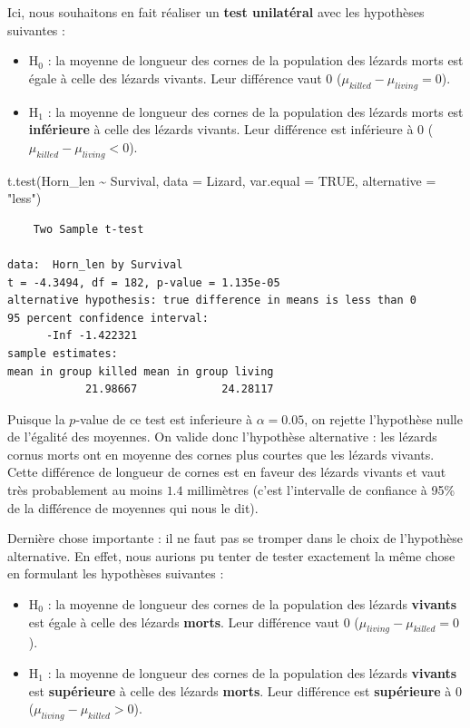 \documentclass[
  a4paper,
]{article}
\newenvironment{Shaded}{\begin{snugshade}}{\end{snugshade}}
\newcommand{\AttributeTok}[1]{\textcolor[rgb]{0.00,0.34,0.68}{#1}}
\newcommand{\ConstantTok}[1]{\textcolor[rgb]{0.67,0.33,0.00}{#1}}
\newcommand{\FunctionTok}[1]{\textcolor[rgb]{0.39,0.29,0.61}{#1}}
\newcommand{\NormalTok}[1]{\textcolor[rgb]{0.12,0.11,0.11}{#1}}
\newcommand{\SpecialCharTok}[1]{\textcolor[rgb]{0.24,0.68,0.91}{#1}}
\newcommand{\StringTok}[1]{\textcolor[rgb]{0.75,0.01,0.01}{#1}}
\providecommand{\tightlist}{%
  \setlength{\itemsep}{0pt}\setlength{\parskip}{0pt}}
\begin{document}
Ici, nous souhaitons en fait réaliser un \textbf{test unilatéral} avec les hypothèses suivantes :

\begin{itemize}
\tightlist
\item
  H\(_0\) : la moyenne de longueur des cornes de la population des lézards morts est égale à celle des lézards vivants. Leur différence vaut 0 (\(\mu_{killed}-\mu_{living} = 0\)).
\item
  H\(_1\) : la moyenne de longueur des cornes de la population des lézards morts est \textbf{inférieure} à celle des lézards vivants. Leur différence est inférieure à 0 (\(\mu_{killed}-\mu_{living} < 0\)).
\end{itemize}

\begin{Shaded}
\begin{Highlighting}[]
\FunctionTok{t.test}\NormalTok{(Horn\_len }\SpecialCharTok{\textasciitilde{}}\NormalTok{ Survival, }
       \AttributeTok{data =}\NormalTok{ Lizard, }\AttributeTok{var.equal =} \ConstantTok{TRUE}\NormalTok{,}
       \AttributeTok{alternative =} \StringTok{"less"}\NormalTok{)}
\end{Highlighting}
\end{Shaded}

\begin{verbatim}
    Two Sample t-test

data:  Horn_len by Survival
t = -4.3494, df = 182, p-value = 1.135e-05
alternative hypothesis: true difference in means is less than 0
95 percent confidence interval:
      -Inf -1.422321
sample estimates:
mean in group killed mean in group living 
            21.98667             24.28117 
\end{verbatim}

Puisque la \(p\)-value de ce test est inferieure à \(\alpha = 0.05\), on rejette l'hypothèse nulle de l'égalité des moyennes. On valide donc l'hypothèse alternative : les lézards cornus morts ont en moyenne des cornes plus courtes que les lézards vivants. Cette différence de longueur de cornes est en faveur des lézards vivants et vaut très probablement au moins \(1.4\) millimètres (c'est l'intervalle de confiance à 95\% de la différence de moyennes qui nous le dit).

Dernière chose importante : il ne faut pas se tromper dans le choix de l'hypothèse alternative. En effet, nous aurions pu tenter de tester exactement la même chose en formulant les hypothèses suivantes :

\begin{itemize}
\tightlist
\item
  H\(_0\) : la moyenne de longueur des cornes de la population des lézards \textbf{vivants} est égale à celle des lézards \textbf{morts}. Leur différence vaut 0 (\(\mu_{living}-\mu_{killed} = 0\)).
\item
  H\(_1\) : la moyenne de longueur des cornes de la population des lézards \textbf{vivants} est \textbf{supérieure} à celle des lézards \textbf{morts}. Leur différence est \textbf{supérieure} à 0 (\(\mu_{living}-\mu_{killed} > 0\)).
\end{itemize}
\end{document}
